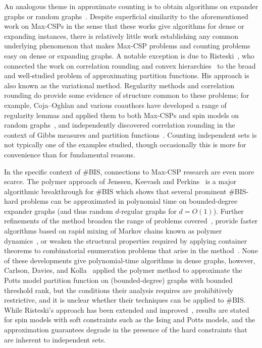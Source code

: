 \documentclass[11pt,letterpaper]{amsart}
\theoremstyle{definition}
\begin{document}
An analogous theme in approximate counting is to obtain algorithms on expander graphs or random graphs~\cite{BGG+18,CDF+22a,GGS20,HJP23,JKP19b}.
Despite superficial similarity to the aforementioned work on Max-CSPs in the sense that these works give algorithms for dense or expanding instances, there is relatively little work establishing any common underlying phenomenon that makes Max-CSP problems and counting problems easy on dense or expanding graphs. 
A notable exception is due to Risteski~\cite{Ris16}, who connected the work on correlation rounding and convex hierarchies~\cite{BRS11a} to the broad and well-studied problem of approximating partition functions. His approach is also known as the variational method.
Regularity methods and correlation rounding do provide some evidence of structure common to these problems; for example, Coja--Oghlan and various coauthors have developed a range of regularity lemmas and applied them to both Max-CSPs and spin models on random graphs~\cite{BC16,CCF10,CP16}, and independently discovered correlation rounding in the context of Gibbs measures and partition functions~\cite{CP19a}. 
Counting independent sets is not typically one of the examples studied, though occasionally this is more for convenience than for fundamental reasons. 

In the specific context of \#BIS, connections to Max-CSP research are even more scarce.
The polymer approach of Jenssen, Keevash and Perkins~\cite{JKP19b} is a major algorithmic breakthrough for \#BIS which shows that several prominent \#BIS-hard problems can be approximated in polynomial time on bounded-degree expander graphs (and thus random $d$-regular graphs for $d=O(1)$). 
Further refinements of the method broaden the range of problems covered~\cite{GGS20,HJP23}, provide faster algorithms based on rapid mixing of Markov chains known as polymer dynamics~\cite{CGG+19}, or weaken the structural properties required by applying container theorems to combinatorial enumeration problems that arise in the method~\cite{CDF+22a,JPP22}. 
None of these developments give polynomial-time algorithms in dense graphs, however,
Carlson, Davies, and Kolla~\cite{CDK20} applied the polymer method to approximate the Potts model partition function on (bounded-degree) graphs with bounded threshold rank, but the conditions their analysis requires are prohibitively restrictive, and it is unclear whether their techniques can be applied to \#BIS.
While Risteski's approach has been extended and improved~\cite{JKR19,KLR22a}, results are stated for spin models with soft constraints such as the Ising and Potts models, and the approximation guarantees degrade in the presence of the hard constraints that are inherent to independent sets. 
\end{document}
